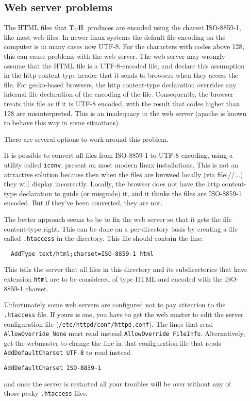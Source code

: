 \documentclass[12pt]{article}
\def\TtH{$\rm{}T_TH$}
\begin{document}
\subsection{Web server problems}

The HTML files that \TtH\ produces are encoded using the charset
ISO-8859-1, like most web files. In newer linux systems the default
file encoding on the computer is in many cases now UTF-8. For the
characters with codes above 128, this can cause problems with the web
server. The web server may wrongly assume that the HTML file is a
UTF-8-encoded file, and declare this assumption in the http content-type
header that it sends to browsers when they access the file. For
gecko-based browsers, the http content-type declaration overrides any
internal file declaration of the encoding of the file. Consequently,
the browser treats this file as if it is UTF-8 encoded, with the
result that codes higher than 128 are misinterpreted. This is an
inadequacy in the web server (apache is known to behave this way in
some situations).

There are several options to work around this problem.

It is possible to convert all files from ISO-8859-1 to UTF-8 encoding,
using a utility called \verb!iconv!, present on most modern linux
installations. This is not an attractive solution because then when
the files are browsed locally (via file://...) they will display
incorrectly. Locally, the browser does not have the http content-type
declaration to guide (or misguide) it, and it thinks the files are
ISO-8859-1 encoded. But if they've been converted, they are not.

The better approach seems to be to fix the web server so that it gets
the file content-type right. This can be done on a per-directory basis
by creating a file called \verb!.htaccess! in the directory. This file
should contain the line:
\begin{verbatim}
  AddType text/html;charset=ISO-8859-1 html
\end{verbatim}
This tells the server that all files in this directory and its
subdirectories that have extension \verb!html! are to be considered of
type HTML and encoded with the ISO-8859-1 charset.

Unfortunately some web servers are configured not to pay attention to
the \verb!.htaccess! file. If yours is one, you have to get the web
master to edit the server configuration file
(\verb!/etc/httpd/conf/httpd.conf!). The lines that read
\verb!AllowOverride None! must read instead
\verb!AllowOverride FileInfo!. Alternatively, get the webmaster to
change the line in that configuration file that reads
\verb!AddDefaultCharset UTF-8! to read instead
\begin{verbatim}
AddDefaultCharset ISO-8859-1
\end{verbatim}
 and once the server is restarted all your troubles will be over
without any of those pesky \verb!.htaccess! files.
 
\end{document}
